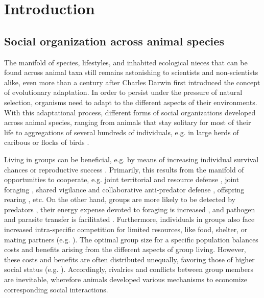 %
%
%

\chapter{Introduction}
\label{Intro}

\section{Social organization across animal species}

The manifold of species, lifestyles, and inhabited ecological nieces that can be found across animal taxa still remains astonishing to scientists and non-scientists alike, even more than a century after Charles Darwin first introduced the concept of evolutionary adaptation. In order to persist under the pressure of natural selection, organisms need to adapt to the different aspects of their environments. With this adaptational process, different forms of social organizations developed across animal species, ranging from animals that stay solitary for most of their life \citep{Cigliano1993, Cornhill2020} to aggregations of several hundreds of individuals, e.g. in large herds of caribous or flocks of birds \citep{Nagy2010, Torney2018}. 

Living in groups can be beneficial, e.g. by means of increasing individual survival chances or reproductive success \citep{Clutton-Brock1999, Sword2005, Bilde2007}. Primarily, this results from the manifold of opportunities to cooperate, e.g. joint territorial and resource defense \citep{Geffen1996, Markham2017}, joint foraging \citep{Hojesjo1998}, shared vigilance and collaborative anti-predator defense \citep{Chivers1995, Clutton-Brock1999, Barber2000, Hass2002, Sword2005}, offspring rearing \citep{DeWoody2000}, etc. On the other hand, groups are more likely to be detected by predators \citep{Cote1995}, their energy expense devoted to foraging is increased \citep{Korstjens2006}, and pathogen and parasite transfer is facilitated \citep{Chapman1995, Cote1995}. Furthermore, individuals in groups also face increased intra-specific competition for limited resources, like food, shelter, or mating partners (e.g. \citealp{Cluttonbrock1979, Janson1985}). The optimal group size for a specific population balances costs and benefits arising from the different aspects of group living. However, these costs and benefits are often distributed unequally, favoring those of higher social status (e.g. \citealp{Janson1985, Wauters1992, Kappeler2008}). Accordingly, rivalries and conflicts between group members are inevitable, wherefore animals developed various mechanisms to economize corresponding social interactions.

